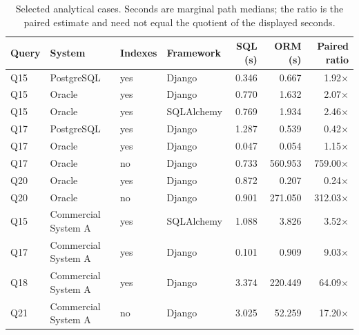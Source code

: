 \begin{table}[!t]
\caption{Selected analytical cases. Seconds are marginal path medians; the ratio is the paired estimate and need not equal the quotient of the displayed seconds.}\label{tab:cases}
\centering\small\renewcommand{\arraystretch}{1.15}
\begin{tabular}{llllrrr}\toprule
Query & System & Indexes & Framework & SQL (s) & ORM (s) & Paired ratio \\\midrule
Q15 & PostgreSQL & yes & Django & 0.346 & 0.667 & 1.92$\times$ \\
Q15 & Oracle & yes & Django & 0.770 & 1.632 & 2.07$\times$ \\
Q15 & Oracle & yes & SQLAlchemy & 0.769 & 1.934 & 2.46$\times$ \\
Q17 & PostgreSQL & yes & Django & 1.287 & 0.539 & 0.42$\times$ \\
Q17 & Oracle & yes & Django & 0.047 & 0.054 & 1.15$\times$ \\
Q17 & Oracle & no & Django & 0.733 & 560.953 & 759.00$\times$ \\
Q20 & Oracle & yes & Django & 0.872 & 0.207 & 0.24$\times$ \\
Q20 & Oracle & no & Django & 0.901 & 271.050 & 312.03$\times$ \\
Q15 & Commercial System A & yes & SQLAlchemy & 1.088 & 3.826 & 3.52$\times$ \\
Q17 & Commercial System A & yes & Django & 0.101 & 0.909 & 9.03$\times$ \\
Q18 & Commercial System A & yes & Django & 3.374 & 220.449 & 64.09$\times$ \\
Q21 & Commercial System A & no & Django & 3.025 & 52.259 & 17.20$\times$ \\
\bottomrule\end{tabular}\end{table}
